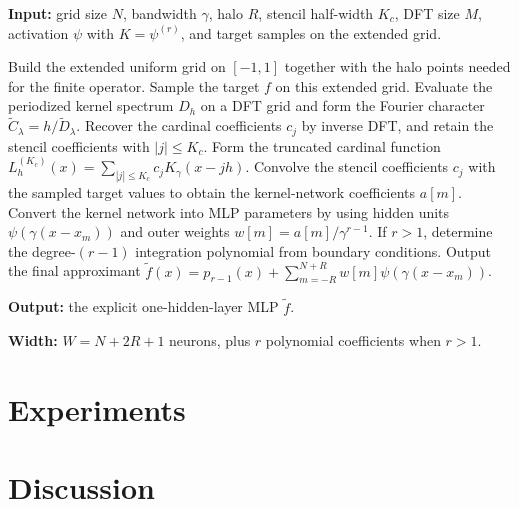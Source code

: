 \documentclass{article}
\begin{document}
\begin{algorithm}[t]
\caption{Explicit Quasi-Interpolant MLP Construction}
\label{alg:qi-mlp}
\small
\begin{algorithmic}[1]
\Statex \textbf{Input:} grid size \(N\), bandwidth \(\gamma\), halo \(R\), stencil half-width \(K_c\), DFT size \(M\), activation \(\psi\) with \(K=\psi^{(r)}\), and target samples on the extended grid.

\State Build the extended uniform grid on \([-1,1]\) together with the halo points needed for the finite operator.
\State Sample the target \(f\) on this extended grid.
\State Evaluate the periodized kernel spectrum \(D_h\) on a DFT grid and form the Fourier character \(\widetilde{C}_\lambda = h/\widetilde{D}_\lambda\).
\State Recover the cardinal coefficients \(c_j\) by inverse DFT, and retain the stencil coefficients with \(|j| \le K_c\).
\State Form the truncated cardinal function \(L_h^{(K_c)}(x) = \sum_{|j|\le K_c} c_j K_\gamma(x-jh)\).
\State Convolve the stencil coefficients \(c_j\) with the sampled target values to obtain the kernel-network coefficients \(a[m]\).
\State Convert the kernel network into MLP parameters by using hidden units \(\psi(\gamma(x-x_m))\) and outer weights \(w[m] = a[m]/\gamma^{r-1}\).
\State If \(r>1\), determine the degree-\((r-1)\) integration polynomial from boundary conditions.
\State Output the final approximant \(\widetilde f(x) = p_{r-1}(x) + \sum_{m=-R}^{N+R} w[m]\psi(\gamma(x-x_m))\).

\Statex \textbf{Output:} the explicit one-hidden-layer MLP \(\widetilde f\).

\Statex \textbf{Width:} \(W = N + 2R + 1\) neurons, plus \(r\) polynomial coefficients when \(r>1\).
\end{algorithmic}
\end{algorithm}


\section{Experiments}

\section{Discussion}

\medskip
\small



\end{document}
